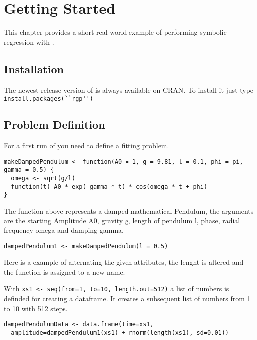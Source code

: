 
\chapter{Getting Started}
This chapter provides a short real-world example of performing symbolic regression with \RGP.

\section{Installation}

The newest release version of \RGP is always available on CRAN. To install it just type
\lstinline!install.packages(``rgp'')! 

\section{Problem Definition}

For a first run of \RGP you need to define a fitting problem.
\begin{lstlisting}[caption = {Creating a function with variables}, label = lstExample]
makeDampedPendulum <- function(A0 = 1, g = 9.81, l = 0.1, phi = pi, gamma = 0.5) {
  omega <- sqrt(g/l)
  function(t) A0 * exp(-gamma * t) * cos(omega * t + phi)
}
\end{lstlisting}

The function above represents a damped mathematical Pendulum, the arguments are the starting Amplitude A0, 
gravity g, length of pendulum l, phase, radial frequency omega and damping gamma.

\begin{lstlisting}[caption = {Attributes}, label = tutattributes]
dampedPendulum1 <- makeDampedPendulum(l = 0.5)
\end{lstlisting}

Here is a example of alternating the given attributes, 
the lenght is altered and the function is assigned to a new name.

With \lstinline!xs1 <- seq(from=1, to=10, length.out=512)!
a list of numbers is definded for creating a dataframe. It creates a subsequent list of numbers from 1 to 10
with 512 steps.

\begin{lstlisting}[caption = {Data Frame Creation}, label = tutdataframe]
dampedPendulumData <- data.frame(time=xs1,
  amplitude=dampedPendulum1(xs1) + rnorm(length(xs1), sd=0.01))
\end{lstlisting}

